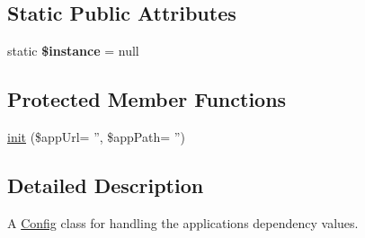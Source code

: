 \subsection*{Static Public Attributes}
\begin{DoxyCompactItemize}
\item 
\hypertarget{classTk_1_1Config_a72790ffe560d691c3d411c0102974a3c}{static {\bfseries \$instance} = null}\label{classTk_1_1Config_a72790ffe560d691c3d411c0102974a3c}

\end{DoxyCompactItemize}
\subsection*{Protected Member Functions}
\begin{DoxyCompactItemize}
\item 
\hyperlink{classTk_1_1Config_adaf29d4b83d6ed431da8bef0bd454b92}{init} (\$app\+Url= '', \$app\+Path= '')
\end{DoxyCompactItemize}


\subsection{Detailed Description}
A \hyperlink{classTk_1_1Config}{Config} class for handling the applications dependency values.

